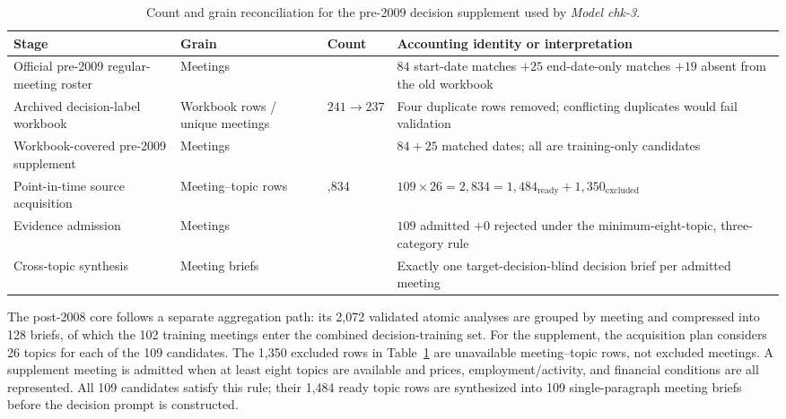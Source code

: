 \begin{table}[H]
    \centering
    \scriptsize
    \begin{tabularx}{\textwidth}{@{}
        >{\raggedright\arraybackslash}p{}
        >{\raggedright\arraybackslash}p{}
        >{\centering\arraybackslash}p{}
        >{\raggedright\arraybackslash}X
    @{}}
        \toprule
        \textbf{Stage} & \textbf{Grain} & \textbf{Count} & \textbf{Accounting identity or interpretation} \\
        \midrule
        Official pre-2009 regular-meeting roster
        & Meetings & 128
        & $84$ start-date matches $+25$ end-date-only matches $+19$ absent from the old workbook \\

        Archived decision-label workbook
        & Workbook rows / unique meetings & $241\rightarrow237$
        & Four duplicate rows removed; conflicting duplicates would fail validation \\

        Workbook-covered pre-2009 supplement
        & Meetings & 109
        & $84+25$ matched dates; all are training-only candidates \\

        Point-in-time source acquisition
        & Meeting--topic rows & 2,834
        & $109\times26=2{,}834=1{,}484_{\mathrm{ready}}+1{,}350_{\mathrm{excluded}}$ \\

        Evidence admission
        & Meetings & 109
        & $109$ admitted $+0$ rejected under the minimum-eight-topic, three-category rule \\

        Cross-topic synthesis
        & Meeting briefs & 109
        & Exactly one target-decision-blind decision brief per admitted meeting \\
        \bottomrule
    \end{tabularx}
    \caption{Count and grain reconciliation for the pre-2009 decision supplement used by \textit{Model chk-3}.}
    \label{tab:ch2:chk3_pre2009_lineage}
\end{table}

The post-2008 core follows a separate aggregation path: its 2,072 validated
atomic analyses are grouped by meeting and compressed into 128 briefs, of
which the 102 training meetings enter the combined decision-training set. For
the supplement, the acquisition plan considers 26 topics for each of the 109
candidates. The 1,350 excluded rows in
Table~\ref{tab:ch2:chk3_pre2009_lineage} are unavailable meeting--topic rows,
not excluded meetings. A supplement meeting is admitted when at least eight
topics are available and prices, employment/activity, and financial conditions
are all represented. All 109 candidates satisfy this rule; their 1,484 ready
topic rows are synthesized into 109 single-paragraph meeting briefs before the
decision prompt is constructed.

